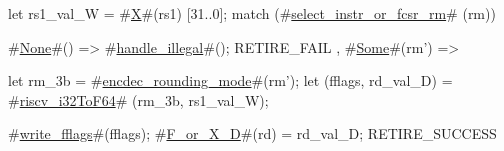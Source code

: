 let rs1_val_W = #\hyperref[sailRISCVzX]{X}#(rs1) [31..0];
match (#\hyperref[sailRISCVzselectzyinstrzyorzyfcsrzyrm]{select\_instr\_or\_fcsr\_rm}# (rm)) {
  #\hyperref[sailRISCVzNone]{None}#() => { #\hyperref[sailRISCVzhandlezyillegal]{handle\_illegal}#(); RETIRE_FAIL },
  #\hyperref[sailRISCVzSome]{Some}#(rm') => {
    let rm_3b = #\hyperref[sailRISCVzencdeczyroundingzymode]{encdec\_rounding\_mode}#(rm');
    let (fflags, rd_val_D) = #\hyperref[sailRISCVzriscvzyi32ToF64]{riscv\_i32ToF64}# (rm_3b, rs1_val_W);

    #\hyperref[sailRISCVzwritezyfflags]{write\_fflags}#(fflags);
    #\hyperref[sailRISCVzFzyorzyXzyD]{F\_or\_X\_D}#(rd) = rd_val_D;
    RETIRE_SUCCESS
  }
}
